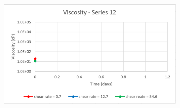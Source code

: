 \begin{appendices}
\begin{figure}
{\begin{subfigure}[b]{0.6\textwidth}
     \end{subfigure}
     \begin{subfigure}[b]{0.6\textwidth}
         \centering
         \includegraphics[width=\textwidth]{img/visc/12.png}
     \end{subfigure}
    }\\
\end{figure}
\end{appendices}
